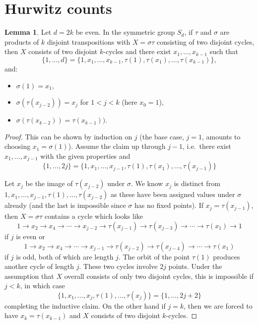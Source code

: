 \documentclass[11pt]{article}           %
\theoremstyle{definition}
\newtheorem{lem}[thm]{Lemma}
\begin{document}
\appendix
\section{Hurwitz counts}
\label{appendix:hurwitz}

\begin{lem}
  \label{lem:even}
  Let $d=2k$ be even. In the symmetric group $S_d$, if $\tau$ and $\sigma$ are products of $k$ disjoint
  transpositions with $X=\sigma\tau$ consisting of two disjoint cycles, then $X$
  consists of two disjoint $k$-cycles and there exist
  $x_1,\dots,x_{k-1}$ such that
  \[
  \{1,\dots,d\}=\{1,x_1,\dots,x_{k-1},\tau(1),\tau(x_1),\dots,\tau(x_{k-1})\},
  \]
  and:
  \begin{itemize}
  \item $\sigma(1)=x_1$, 
  \item $\sigma(\tau(x_{j-2}))=x_j$ for $1<j<k$ (here $x_0=1$),
  \item $\sigma(\tau(x_{k-2}))= \tau(x_{k-1}))$.
  \end{itemize}
\end{lem}
\begin{proof}
  This can be shown by induction on $j$ (the base case, $j=1$, amounts to choosing $x_1=\sigma(1)$).
  Assume the claim up through $j-1$, i.e.\ there exist
  $x_1,\dots,x_{j-1}$ with the given properties and
  \[\{1,\dots,2j\}=\{1,x_1,\dots,x_{j-1},\tau(1),\tau(x_1),\dots,\tau(x_{j-1})\}\]

  Let $x_j$ be
  the image of $\tau(x_{j-2})$ under $\sigma$.
  We know $x_j$ is distinct from $1,x_1,\dots,x_{j-1},\tau(1),\dots,\tau(x_{j-2})$
  as these have been assigned values under $\sigma$ already (and the last is impossible
  since $\sigma$ has no fixed points).
  If $x_j=\tau(x_{j-1})$, then $X=\sigma\tau$ contains a cycle
  which looks like
  \[
  1\to x_2\to x_4\to\cdots\to x_{j-2}\to \tau(x_{j-1})\to \tau(x_{j-3})\to\cdots\to \tau(x_1)\to 1
  \]
  if $j$ is even or
  \[
  1\to x_2\to x_4\to\cdots\to x_{j-1}\to \tau(x_{j-2})\to \tau(x_{j-4})\to\cdots\to \tau(x_1)
  \]
  if $j$ is odd, both of which are length $j$. The orbit of the point $\tau(1)$ produces
  another cycle of length $j$. These two cycles involve $2j$ points.
  Under the assumption that $X$ overall consists of only
  two disjoint cycles, this is impossible if $j<k$, in which case
  \[
  \{1,x_1,\dots,x_{j},\tau(1),\dots,\tau(x_{j})\}=\{1,\dots,2j+2\}
  \]
  completing the inductive claim. On the other hand if $j=k$, then
  we are forced to have $x_k=\tau(x_{k-1})$
  and $X$ consists of two disjoint $k$-cycles.

  \end{proof}
\end{document}
